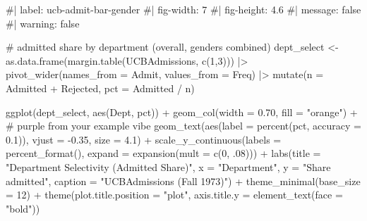 \documentclass[
  letterpaper,
  DIV=11,
  numbers=noendperiod]{scrreprt}
\newenvironment{Shaded}{\begin{snugshade}}{\end{snugshade}}
\newcommand{\AttributeTok}[1]{\textcolor[rgb]{0.40,0.45,0.13}{#1}}
\newcommand{\CommentTok}[1]{\textcolor[rgb]{0.37,0.37,0.37}{#1}}
\newcommand{\DecValTok}[1]{\textcolor[rgb]{0.68,0.00,0.00}{#1}}
\newcommand{\FloatTok}[1]{\textcolor[rgb]{0.68,0.00,0.00}{#1}}
\newcommand{\FunctionTok}[1]{\textcolor[rgb]{0.28,0.35,0.67}{#1}}
\newcommand{\NormalTok}[1]{\textcolor[rgb]{0.00,0.23,0.31}{#1}}
\newcommand{\OtherTok}[1]{\textcolor[rgb]{0.00,0.23,0.31}{#1}}
\newcommand{\SpecialCharTok}[1]{\textcolor[rgb]{0.37,0.37,0.37}{#1}}
\newcommand{\StringTok}[1]{\textcolor[rgb]{0.13,0.47,0.30}{#1}}
\begin{document}
\begin{Shaded}
\begin{Highlighting}[]
\CommentTok{\#| label: ucb{-}admit{-}bar{-}gender}
\CommentTok{\#| fig{-}width: 7}
\CommentTok{\#| fig{-}height: 4.6}
\CommentTok{\#| message: false}
\CommentTok{\#| warning: false}
 
\CommentTok{\# admitted share by department (overall, genders combined)}
\NormalTok{dept\_select }\OtherTok{\textless{}{-}} \FunctionTok{as.data.frame}\NormalTok{(}\FunctionTok{margin.table}\NormalTok{(UCBAdmissions, }\FunctionTok{c}\NormalTok{(}\DecValTok{1}\NormalTok{,}\DecValTok{3}\NormalTok{))) }\SpecialCharTok{|\textgreater{}}
  \FunctionTok{pivot\_wider}\NormalTok{(}\AttributeTok{names\_from =}\NormalTok{ Admit, }\AttributeTok{values\_from =}\NormalTok{ Freq) }\SpecialCharTok{|\textgreater{}}
  \FunctionTok{mutate}\NormalTok{(}\AttributeTok{n =}\NormalTok{ Admitted }\SpecialCharTok{+}\NormalTok{ Rejected,}
         \AttributeTok{pct =}\NormalTok{ Admitted }\SpecialCharTok{/}\NormalTok{ n)}

\FunctionTok{ggplot}\NormalTok{(dept\_select, }\FunctionTok{aes}\NormalTok{(Dept, pct)) }\SpecialCharTok{+}
  \FunctionTok{geom\_col}\NormalTok{(}\AttributeTok{width =} \FloatTok{0.70}\NormalTok{, }\AttributeTok{fill =} \StringTok{"orange"}\NormalTok{) }\SpecialCharTok{+}  \CommentTok{\# purple from your example vibe}
  \FunctionTok{geom\_text}\NormalTok{(}\FunctionTok{aes}\NormalTok{(}\AttributeTok{label =} \FunctionTok{percent}\NormalTok{(pct, }\AttributeTok{accuracy =} \FloatTok{0.1}\NormalTok{)),}
            \AttributeTok{vjust =} \SpecialCharTok{{-}}\FloatTok{0.35}\NormalTok{, }\AttributeTok{size =} \FloatTok{4.1}\NormalTok{) }\SpecialCharTok{+}
  \FunctionTok{scale\_y\_continuous}\NormalTok{(}\AttributeTok{labels =} \FunctionTok{percent\_format}\NormalTok{(),}
                     \AttributeTok{expand =} \FunctionTok{expansion}\NormalTok{(}\AttributeTok{mult =} \FunctionTok{c}\NormalTok{(}\DecValTok{0}\NormalTok{, .}\DecValTok{08}\NormalTok{))) }\SpecialCharTok{+}
  \FunctionTok{labs}\NormalTok{(}\AttributeTok{title =} \StringTok{"Department Selectivity (Admitted Share)"}\NormalTok{,}
       \AttributeTok{x =} \StringTok{"Department"}\NormalTok{, }\AttributeTok{y =} \StringTok{"Share admitted"}\NormalTok{,}
       \AttributeTok{caption =} \StringTok{"UCBAdmissions (Fall 1973)"}\NormalTok{) }\SpecialCharTok{+}
  \FunctionTok{theme\_minimal}\NormalTok{(}\AttributeTok{base\_size =} \DecValTok{12}\NormalTok{) }\SpecialCharTok{+}
  \FunctionTok{theme}\NormalTok{(}\AttributeTok{plot.title.position =} \StringTok{"plot"}\NormalTok{,}
        \AttributeTok{axis.title.y =} \FunctionTok{element\_text}\NormalTok{(}\AttributeTok{face =} \StringTok{"bold"}\NormalTok{))}
\end{Highlighting}
\end{Shaded}
\end{document}
